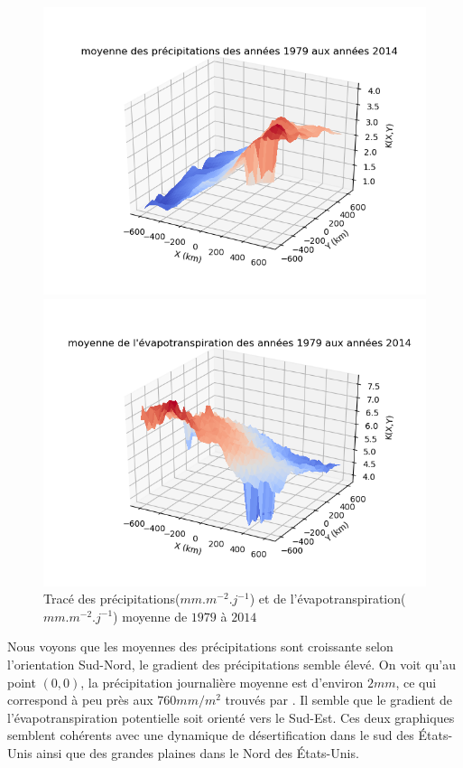 \documentclass[a4paper,11pt]{article}
\numberwithin{equation}{section}
\begin{document}
\begin{figure}[H]
	\begin{center}
		\begin{minipage}[b]{0.49\linewidth}
			\centering \includegraphics[scale=0.5]{images/mean_precip.png}
		\end{minipage}\hfill
		\begin{minipage}[b]{0.49\linewidth}	
			\centering \includegraphics[scale=0.5]{images/mean_evap.png}
		\end{minipage}
	\end{center}
	\caption{Tracé des précipitations($mm.m^{-2}.j^{-1}$) et de l'évapotranspiration($mm.m^{-2}.j^{-1}$) moyenne de $1979$ à $2014$}
\end{figure} 
Nous voyons que les moyennes des précipitations sont croissante selon l'orientation Sud-Nord, le gradient des précipitations semble élevé. On voit qu'au point $(0,0)$, la précipitation journalière moyenne est d'environ $2mm$, ce qui correspond à peu près aux $760 mm/m^2$ trouvés par \cite{allen1991hydrology}. Il semble que le gradient de l'évapotranspiration potentielle soit orienté vers le Sud-Est. Ces deux graphiques semblent cohérents avec une dynamique de désertification dans le sud des États-Unis ainsi que des grandes plaines dans le Nord des États-Unis.
\end{document}
